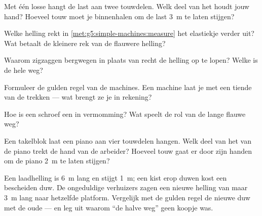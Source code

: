 \begin{exercise}[$\star$]\label{exo:g5:simple-machines:4}
Met één losse  hangt de last aan twee touwdelen. Welk deel van
het  houdt jouw hand? Hoeveel touw moet je binnenhalen om de
last \qty{3}{m} te laten stijgen?
\end{exercise}

\begin{exercise}[$\star$]\label{exo:g5:simple-machines:5}
Welke helling rekt in \cref{met:g5:simple-machines:measure} het
elastiekje verder uit? Wat betaalt de kleinere rek van de flauwere
helling?
\end{exercise}

\begin{exercise}[$\star$]\label{exo:g5:simple-machines:6}
Waarom zigzaggen bergwegen in plaats van recht de helling op te lopen?
Welke  is de hele weg?
\end{exercise}

\begin{exercise}[$\star$]\label{exo:g5:simple-machines:7}
Formuleer de gulden regel van de machines. Een machine laat je met een
tiende van de  trekken --- wat brengt ze je in rekening?
\end{exercise}

\begin{exercise}[$\star$]\label{exo:g5:simple-machines:8}
Hoe is een schroef een  in vermomming? Wat speelt de rol
van de lange flauwe weg?
\end{exercise}

\begin{exercise}[$\star\star$]\label{exo:g5:simple-machines:9}
Een takelblok laat een piano aan vier touwdelen hangen. Welk deel van
het  van de piano trekt de hand van de arbeider? Hoeveel
 touw gaat er door zijn handen om de piano \qty{2}{m} te laten
stijgen?
\end{exercise}

\begin{exercise}[$\star\star$]\label{exo:g5:simple-machines:10}
Een laadhelling is \qty{6}{m} lang en stijgt \qty{1}{m}; een kist
erop duwen kost een bescheiden duw. De ongeduldige verhuizers zagen
een nieuwe helling van maar \qty{3}{m} lang naar hetzelfde platform.
Vergelijk met de gulden regel de nieuwe duw met de oude --- en leg uit
waarom ``de halve weg'' geen koopje was.
\end{exercise}

